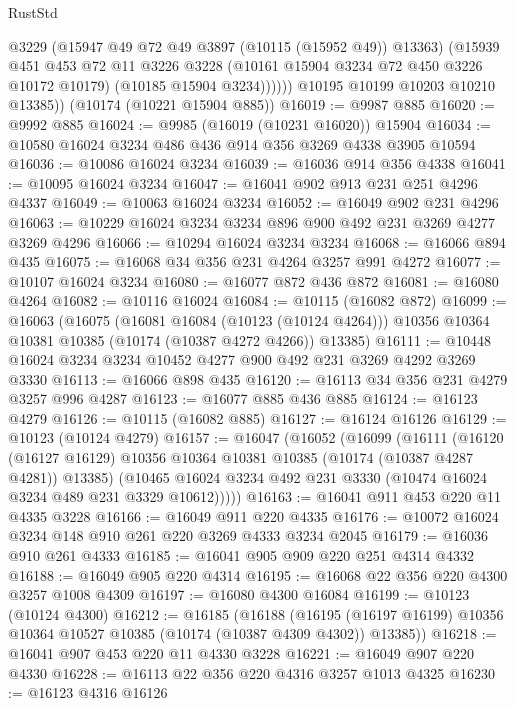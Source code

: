 \begin{lexlean}{RustStd}
\begin{coremodule}
                @3229
                (@15947 @49 @72 @49 @3897 (@10115 (@15952 @49)) @13363)
                (@15939
                  @451
                  @453
                  @72
                  @11
                  @3226
                  @3228
                  (@10161 @15904 @3234 @72 @450 @3226 @10172 @10179)
                  (@10185 @15904 @3234))))))
        @10195
        @10199
        @10203
        @10210
        @13385))
    (@10174 (@10221 @15904 @885))
@16019 := @9987 @885
@16020 := @9992 @885
@16024 := @9985 (@16019 (@10231 @16020)) @15904
@16034 := @10580 @16024 @3234 @486 @436 @914 @356 @3269 @4338 @3905 @10594
@16036 := @10086 @16024 @3234
@16039 := @16036 @914 @356 @4338
@16041 := @10095 @16024 @3234
@16047 := @16041 @902 @913 @231 @251 @4296 @4337
@16049 := @10063 @16024 @3234
@16052 := @16049 @902 @231 @4296
@16063 := @10229 @16024 @3234 @3234 @896 @900 @492 @231 @3269 @4277 @3269 @4296
@16066 := @10294 @16024 @3234 @3234
@16068 := @16066 @894 @435
@16075 := @16068 @34 @356 @231 @4264 @3257 @991 @4272
@16077 := @10107 @16024 @3234
@16080 := @16077 @872 @436 @872
@16081 := @16080 @4264
@16082 := @10116 @16024
@16084 := @10115 (@16082 @872)
@16099 := @16063
    (@16075
      (@16081 @16084 (@10123 (@10124 @4264)))
      @10356
      @10364
      @10381
      @10385
      (@10174 (@10387 @4272 @4266))
      @13385)
@16111 := @10448 @16024 @3234 @3234 @10452 @4277 @900 @492 @231 @3269 @4292 @3269 @3330
@16113 := @16066 @898 @435
@16120 := @16113 @34 @356 @231 @4279 @3257 @996 @4287
@16123 := @16077 @885 @436 @885
@16124 := @16123 @4279
@16126 := @10115 (@16082 @885)
@16127 := @16124 @16126
@16129 := @10123 (@10124 @4279)
@16157 := @16047
    (@16052
      (@16099
        (@16111
          (@16120 (@16127 @16129) @10356 @10364 @10381 @10385 (@10174 (@10387 @4287 @4281)) @13385)
          (@10465 @16024 @3234 @492 @231 @3330 (@10474 @16024 @3234 @489 @231 @3329 @10612)))))
@16163 := @16041 @911 @453 @220 @11 @4335 @3228
@16166 := @16049 @911 @220 @4335
@16176 := @10072 @16024 @3234 @148 @910 @261 @220 @3269 @4333 @3234 @2045
@16179 := @16036 @910 @261 @4333
@16185 := @16041 @905 @909 @220 @251 @4314 @4332
@16188 := @16049 @905 @220 @4314
@16195 := @16068 @22 @356 @220 @4300 @3257 @1008 @4309
@16197 := @16080 @4300 @16084
@16199 := @10123 (@10124 @4300)
@16212 := @16185
    (@16188
      (@16195 (@16197 @16199) @10356 @10364 @10527 @10385 (@10174 (@10387 @4309 @4302)) @13385))
@16218 := @16041 @907 @453 @220 @11 @4330 @3228
@16221 := @16049 @907 @220 @4330
@16228 := @16113 @22 @356 @220 @4316 @3257 @1013 @4325
@16230 := @16123 @4316 @16126

\end{coremodule}
\end{lexlean}
